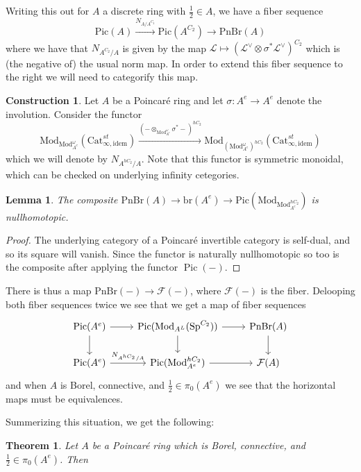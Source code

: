 \documentclass{article}
\DeclareMathOperator{\Pic}{Pic} %
\newcommand{\pnbr}{\ensuremath{\mathrm{PnBr}}}
\newcommand{\pic}{\ensuremath{\mathrm{Pic}}}
\newtheorem{theorem}[equation]{Theorem}
\newtheorem{lemma}[equation]{Lemma}
\theoremstyle{definition}
\newtheorem{construction}[equation]{Construction}
\begin{document}
Writing this out for $A$ a discrete ring with $\frac{1}{2}\in A$, we have a fiber sequence \[\pic(A)\xrightarrow{N_{A/A^{C_2}}}\pic(A^{C_2})\to \pnbr(A)\] where we have that $N_{A^{C_2}/A}$ is given by the map $\mathcal{L}\mapsto (\mathcal{L}^{\vee}\otimes \sigma^*\mathcal{L}^\vee)^{C_2}$ which is (the negative of) the usual norm map. In order to extend this fiber sequence to the right we will need to categorify this map.
	
	\begin{construction}
		Let $A$ be a Poincar{\'e} ring and let $\sigma: A^e\to A^e$ denote the involution. Consider the functor \[\mathrm{Mod}_{\mathrm{Mod}_{A^{e}}^\omega}(\mathrm{Cat}_{\infty, \textrm{idem}}^{st})\xrightarrow{\left(-\otimes_{\mathrm{Mod}_{A^e}^\omega} \sigma^*-\right)^{hC_2}}\mathrm{Mod}_{(\mathrm{Mod}_{A^e}^\omega)^{hC_2}}(\mathrm{Cat}_{\infty, \textrm{idem}}^{st})\] which we will denote by $N_{A^{hC_2}/A}$. Note that this functor is symmetric monoidal, which can be checked on underlying infinity cetegories. 
	\end{construction}
	
	\begin{lemma}
		The composite $\pnbr(A)\to \mathrm{br}(A^e)\to \mathrm{Pic}(\mathrm{Mod}_{\mathrm{Mod}_{A^e}^{hC_2}})$ is nullhomotopic. 
	\end{lemma}
	\begin{proof}
		The underlying category of a Poincar{\'e} invertible category is self-dual, and so its square will vanish. Since the functor is naturally nullhomotopic so too is the composite after applying the functor $\Pic(-)$.
	\end{proof}
	
	There is thus a map $\pnbr(-)\to \mathcal{F}(-)$, where $\mathcal{F}(-)$ is the fiber. Delooping both fiber sequences twice we see that we get a map of fiber sequences \[
	\begin{tikzcd}
		\Pic(A^e)\ar[r] \ar[d] & \Pic(\mathrm{Mod}_{A^L}(\mathrm{Sp}^{C_2})) \ar[r] \ar[d] & \pnbr(A) \ar[d]\\
		\Pic(A^e)\ar[r,"N_{A^{hC_2}/A}"] &\Pic(\mathrm{Mod}_{A^e}^{hC_2}) \ar[r] & \mathcal{F}(A) 
	\end{tikzcd}
	\]
	and when $A$ is Borel, connective, and $\frac{1}{2}\in \pi_0(A^e)$ we see that the horizontal maps must be equivalences.

    Summerizing this situation, we get the following:
    \begin{theorem}
        Let $A$ be a Poincar{\'e} ring which is Borel, connective, and $\frac{1}{2}\in \pi_0(A^e)$. Then 
    \end{theorem}
\end{document}
